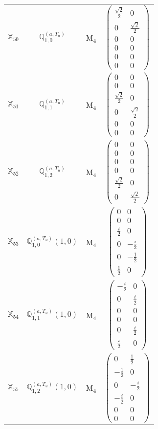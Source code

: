 \documentclass[fleqn,10pt,landscape]{article}
\begin{document}
\begin{itemize}
\begin{center}
\begin{longtable}{c|c|c|c}
$ \mathbb{X}_{50} $ & $\mathbb{Q}_{1,0}^{(a,T_{u})}$ & M$_{4}$ & $\begin{pmatrix} \frac{\sqrt{2}}{2} & 0 \\ 0 & \frac{\sqrt{2}}{2} \\ 0 & 0 \\ 0 & 0 \\ 0 & 0 \\ 0 & 0 \end{pmatrix}$ \\
$ \mathbb{X}_{51} $ & $\mathbb{Q}_{1,1}^{(a,T_{u})}$ & M$_{4}$ & $\begin{pmatrix} 0 & 0 \\ 0 & 0 \\ \frac{\sqrt{2}}{2} & 0 \\ 0 & \frac{\sqrt{2}}{2} \\ 0 & 0 \\ 0 & 0 \end{pmatrix}$ \\
$ \mathbb{X}_{52} $ & $\mathbb{Q}_{1,2}^{(a,T_{u})}$ & M$_{4}$ & $\begin{pmatrix} 0 & 0 \\ 0 & 0 \\ 0 & 0 \\ 0 & 0 \\ \frac{\sqrt{2}}{2} & 0 \\ 0 & \frac{\sqrt{2}}{2} \end{pmatrix}$ \\
$ \mathbb{X}_{53} $ & $\mathbb{Q}_{1,0}^{(a,T_{u})}(1,0)$ & M$_{4}$ & $\begin{pmatrix} 0 & 0 \\ 0 & 0 \\ \frac{i}{2} & 0 \\ 0 & - \frac{i}{2} \\ 0 & - \frac{1}{2} \\ \frac{1}{2} & 0 \end{pmatrix}$ \\
$ \mathbb{X}_{54} $ & $\mathbb{Q}_{1,1}^{(a,T_{u})}(1,0)$ & M$_{4}$ & $\begin{pmatrix} - \frac{i}{2} & 0 \\ 0 & \frac{i}{2} \\ 0 & 0 \\ 0 & 0 \\ 0 & \frac{i}{2} \\ \frac{i}{2} & 0 \end{pmatrix}$ \\
$ \mathbb{X}_{55} $ & $\mathbb{Q}_{1,2}^{(a,T_{u})}(1,0)$ & M$_{4}$ & $\begin{pmatrix} 0 & \frac{1}{2} \\ - \frac{1}{2} & 0 \\ 0 & - \frac{i}{2} \\ - \frac{i}{2} & 0 \\ 0 & 0 \\ 0 & 0 \end{pmatrix}$ \\

\end{longtable}
\end{center}
\end{itemize}
\end{document}
